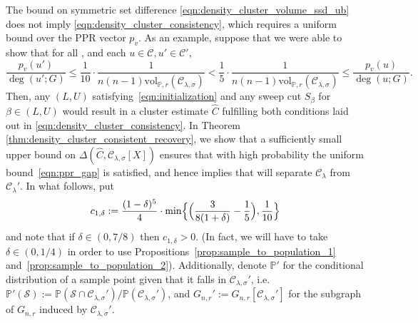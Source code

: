 \documentclass[twoside,11pt]{article}
\newcommand{\1}{\mathbf{1}}
\newcommand{\mc}[1]{\mathcal{#1}}
\newcommand{\Pbb}{\mathbb{P}}
\newcommand{\wh}[1]{\widehat{#1}}
\newcommand{\vol}{\mathrm{vol}}
\begin{document}
The bound on symmetric set difference \eqref{eqn:density_cluster_volume_ssd_ub} does not imply \eqref{eqn:density_cluster_consistency}, which requires a
uniform bound over the PPR vector $p_v$. As an example, suppose that we were
able to show that for all \smash{$\mc{C}' \in \mathbb{C}_f(\lambda), \mc{C}' \neq \mc{C}$}, and each $u \in \mc{C}, u' \in \mc{C}'$,  
\begin{equation}
\label{eqn:ppr_gap}
\frac{p_v(u')}{\deg(u';G)} \leq \frac{1}{10} \cdot \frac{1}{n (n - 1) \vol_{\Pbb,r}(\mc{C}_{\lambda,\sigma})} <
\frac{1}{5} \cdot \frac{1}{n (n-1) \vol_{\Pbb,r}(\mc{C}_{\lambda,\sigma})} \leq \frac{p_v(u)}{\deg(u;G)}. 
\end{equation}
Then, any $(L,U)$ satisfying~\eqref{eqn:initialization} and any sweep cut
$S_{\beta}$ for $\beta \in (L,U)$ would result in a cluster estimate $\wh{C}$ fulfilling both conditions laid out in
\eqref{eqn:density_cluster_consistency}. In Theorem 
\ref{thm:density_cluster_consistent_recovery}, we show that a sufficiently 
small upper bound on $\Delta(\wh{C},\mc{C}_{\lambda,\sigma}[X])$ ensures that with high probability the uniform bound~\eqref{eqn:ppr_gap} is satisfied, and hence implies
that \smash{$\wh{C}$} will separate $\mc{C}_{\lambda}$ from $\mc{C}_{\lambda}'$. In what follows, put
\begin{equation*}
c_{1,\delta} := \frac{(1 - \delta)^5}{4} \cdot \min\Bigl\{\Bigl(\frac{3}{8(1 + \delta)} - \frac{1}{5}\Bigr),\frac{1}{10}\Bigr\}
\end{equation*}
and note that if $\delta \in (0,7/8)$ then $c_{1,\delta} > 0$. (In fact, we will have to take $\delta \in (0,1/4)$ in order to use Propositions~\ref{prop:sample_to_population_1} and~\ref{prop:sample_to_population_2}). Additionally, denote $\Pbb'$ for the conditional distribution of a sample point given that it falls in $\mc{C}_{\lambda,\sigma}'$, i.e. $\Pbb'(\mc{S}) := \Pbb(\mc{S} \cap \mc{C}_{\lambda,\sigma}')/\Pbb(\mc{C}_{\lambda,\sigma}')$, and $G_{n,r}' := G_{n,r}[\mc{C}_{\lambda,\sigma}']$ for the subgraph of $G_{n,r}$ induced by $\mc{C}_{\lambda,\sigma}'$. 
\end{document}
